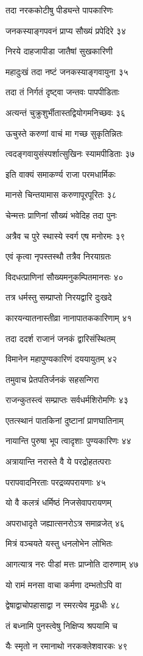 तदा नरककोटीषु पीड्यन्ते पापकारिणः

जनकस्याङ्गपवनं प्राप्य सौख्यं प्रपेदिरे ३४

निरये दाहजापीडा जातैषां सुखकारिणी

महादुःखं तदा नष्टं जनकस्याङ्गवायुना ३५

तदा तं निर्गतं दृष्ट्वा जन्तवः पापपीडिताः

अत्यन्तं चुक्रुशुर्भीतास्तद्वियोगमनिच्छवः ३६

ऊचुस्ते करुणां वाचं मा गच्छ सुकृतिन्नितः

त्वदङ्गवायुसंस्पर्शात्सुखिनः स्यामपीडिताः ३७

इति वाक्यं समाकर्ण्य राजा परमधार्मिकः

मानसे चिन्तयामास करुणापूरपूरितः ३८

चेन्मत्तः प्राणिनां सौख्यं भवेदिह तदा पुनः

अत्रैव च पुरे स्थास्ये स्वर्ग एष मनोरमः ३९

एवं कृत्वा नृपस्तस्थौ तत्रैव निरयाग्रतः

विदधत्प्राणिनां सौख्यमनुकम्पितमानसः ४०

तत्र धर्मस्तु सम्प्राप्तो निरयद्वारि दुःखदे

कारयन्यातनास्तीव्रा नानापातककारिणाम् ४१

तदा ददर्श राजानं जनकं द्वारिसंस्थितम्

विमानेन महापुण्यकारिणं दययायुतम् ४२

तमुवाच प्रेतपतिर्जनकं सहसन्गिरा

राजन्कुतस्त्वं सम्प्राप्तः सर्वधर्मशिरोमणिः ४३

एतत्स्थानं पातकिनां दुष्टानां प्राणघातिनाम्

नायान्ति पुरुषा भूप त्वादृशाः पुण्यकारिणः ४४

अत्रायान्ति नरास्ते वै ये परद्रोहतत्पराः

परापवादनिरताः परद्रव्यपरायणाः ४५

यो वै कलत्रं धर्मिष्ठं निजसेवापरायणम्

अपराधादृते जह्यात्सनरोऽत्र समाव्रजेत् ४६

मित्रं वञ्चयते यस्तु धनलोभेन लोभितः

आगत्यात्र नरः पीडां मत्तः प्राप्नोति दारुणाम् ४७

यो रामं मनसा वाचा कर्मणा दम्भतोऽपि वा

द्वेषाद्वाचोपहासाद्वा न स्मरत्येव मूढधीः ४८

तं बध्नामि पुनस्त्वेषु निक्षिप्य श्रपयामि च

यैः स्मृतो न रमानाथो नरकक्लेशवारकः ४९

